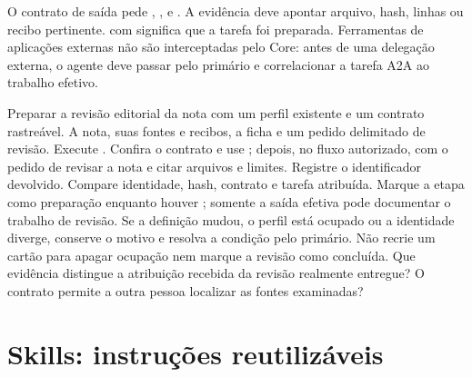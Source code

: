 \begin{limite}
O contrato de saída pede , ,  e
. A evidência deve apontar arquivo, hash, linhas ou recibo
pertinente.  com  significa que a
tarefa foi preparada. Ferramentas de aplicações externas não são interceptadas
pelo Core: antes de uma delegação externa, o agente deve passar pelo primário
e correlacionar a tarefa A2A ao trabalho efetivo.
\end{limite}

\praticacore
{Preparar a revisão editorial da nota com um perfil existente e um contrato rastreável.}
{A nota, suas fontes e recibos, a ficha  e um pedido delimitado de revisão.}
{Execute . Confira o contrato e use ; depois, no fluxo autorizado,  com o pedido de revisar a nota e citar arquivos e limites. Registre o identificador devolvido.}
{Compare identidade, hash, contrato e tarefa atribuída. Marque a etapa como preparação enquanto houver ; somente a saída efetiva pode documentar o trabalho de revisão.}
{Se a definição mudou, o perfil está ocupado ou a identidade diverge, conserve o motivo e resolva a condição pelo primário. Não recrie um cartão para apagar ocupação nem marque a revisão como concluída.}
{Que evidência distingue a atribuição recebida da revisão realmente entregue? O contrato permite a outra pessoa localizar as fontes examinadas?}

\clearpage
\section{Skills: instruções reutilizáveis}


